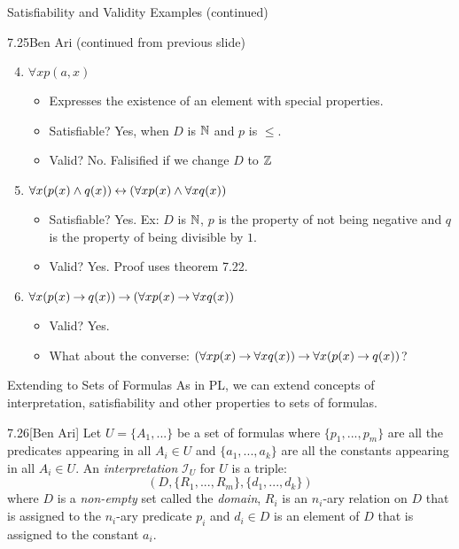 \documentclass[style=sailor,size=12pt]{powerdot}
\begin{document}
\begin{wideslide}[bm=,toc=]{Satisfiability and Validity Examples (continued)}
\begin{defn}{7.25}{Ben Ari}
(continued from previous slide)
\end{defn}
\begin{enumerate}
\setcounter{enumi}{3}
\item<2-> $\forall x p(a,x)$
\begin{itemize}
\item<3-> Expresses the existence of an element with special properties.
\item<3-> Satisfiable? \pause[3] Yes, when $D$ is $\mathbb{N}$ and $p$ is $\leq$.
\item<3-> Valid? \pause No. Falisified if we change $D$ to $\mathbb{Z}$ 
\end{itemize}
\item<6-> $\forall x (p(x) \land q(x)) \mathbin{\leftrightarrow} (\forall x p(x) \land \forall x
    q(x))$
\begin{itemize}
\item<7-> Satisfiable? \pause[3] Yes. Ex: $D$ is $\mathbb{N}$, $p$ is the property of
not being negative and $q$ is the property of being divisible by $1$. 
\item<7-> Valid? \pause Yes. Proof uses theorem 7.22. 
\end{itemize}
\item<10-> $\forall x (p(x) \mathbin{\rightarrow} q(x)) \mathbin{\rightarrow} (\forall x p(x) \mathbin{\rightarrow} \forall x q(x))$
\begin{itemize}
\item<11-> Valid? \pause Yes. 
\item<11-> What about the converse: $(\forall x p(x) \mathbin{\rightarrow} \forall x q(x)) \mathbin{\rightarrow} \forall x (p(x) \mathbin{\rightarrow} q(x))$?
\end{itemize}
\end{enumerate}
\end{wideslide}

\begin{wideslide}[bm=,toc=]{Extending to Sets of Formulas}
As in PL, we can extend concepts of interpretation, satisfiability and other
properties to sets of formulas.
\begin{defn}{7.26}[Ben Ari]
Let $U = \{A_1,...\}$ be a set of formulas where $\{p_1,...,p_m\}$ are all
the predicates appearing in all $A_i \in U$ and $\{a_1,...,a_k\}$ are all the
constants appearing in all $A_i \in U$. An \emph{interpretation} $\mathcal{I}_U$
for $U$ is a triple:
\[(D, \{R_1,...,R_m\},\{d_1,...,d_k\})\]
where $D$ is a \emph{non-empty} set called the \emph{domain}, $R_i$ is an
$n_i$-ary relation on $D$ that is assigned to the $n_i$-ary predicate $p_i$
and $d_i \in D$ is an element of $D$ that is assigned to the constant $a_i$.
\end{defn}
\end{wideslide}
\end{document}
